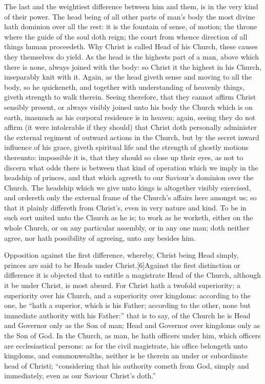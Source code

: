 The last and the weightiest difference between him and them, is in the very kind of their power. The head being of all other parts of man’s body the most divine hath dominion over all the rest: it is the fountain of sense, of motion; the throne where the guide of the soul doth reign; the court from whence direction of all things human proceedeth.  Why Christ is called Head of his Church, these causes they themselves do yield. As the head is the highests part of a man, above which there is none, always joined with the body: so Christ it the highest in his Church, inseparably knit with it. Again, as the head giveth sense and moving to all the body, so he quickeneth, and together with understanding of heavenly things, giveth strength to walk therein. Seeing therefore, that they cannot affirm Christ sensibly present, or always visibly joined unto his body the Church which is on earth, inasmuch as his corporal residence is in heaven; again, seeing they do not affirm (it were intolerable if they should) that Christ doth personally administer the external regiment of outward actions in the Church, but by the secret inward influence of his grace, giveth spiritual life and the strength of ghostly motions thereunto: impossible it is, that they should so close up their eyes, as not to discern what odds there is between that kind of operation which we imply in the headship of princes, and that which agreeth to our Saviour’s dominion over the Church. The headship which we give unto kings is altogether visibly exercised, and ordereth only the external frame of the Church’s affairs here amongst us; so that it plainly differeth from Christ’s, even in very nature and kind. To be in such sort united unto the Church as he is; to work as he worketh, either on the whole Church, or on any particular assembly, or in any one man; doth neither agree, nor hath possibility of agreeing, unto any besides him.

Opposition against the first difference, whereby, Christ being Head simply, princes are said to be Heads under Christ.[6]Against the first distinction or difference it is objected that to entitle a magistrate Head of the Church, although it be under Christ, is most absurd. For Christ hath a twofold superiority; a superiority over his Church, and a superiority over kingdoms: according to the one, he “hath a superior, which is his Father; according to the other, none but immediate authority with his Father:” that is to  say, of the Church he is Head and Governor only as the Son of man; Head and Governor over kingdoms only as the Son of God. In the Church, as man, he hath officers under him, which officers are ecclesiastical persons: as for the civil magistrate, his office belongeth unto kingdoms, and commonwealths, neither is he therein an under or subordinate head of Christi; “considering that his authority cometh from God, simply and immediately, even as our Saviour Christ’s doth.”


